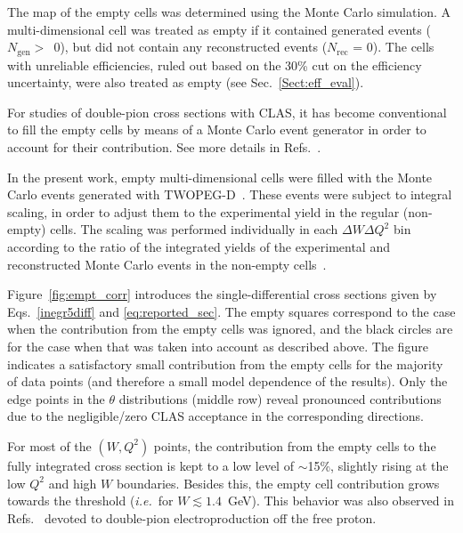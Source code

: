 \documentclass[prc,twocolumn,superscriptaddress,showpacs,amssymb,amsmath,amsfonts,aps,nofootinbib]{revtex4-1}
\begin{document}
The map of the empty cells was determined using the Monte Carlo simulation. A multi-dimensional cell was treated as empty if it contained generated events ($N_{\text{gen}} >$~0), but did not contain any reconstructed events ($N_{\text{rec}}$ = 0). The cells with unreliable efficiencies, ruled out based on the 30\% cut on the efficiency uncertainty, were also treated as empty (see Sec.\!~\ref{Sect:eff_eval}).


For studies of double-pion cross sections with CLAS, it has become conventional to fill the empty cells by means of a Monte Carlo event generator in order to account for their contribution. See more details in Refs.\!~\cite{Rip_an_note:2002,Ripani:2002ss,Fed_an_note:2007,Fedotov:2008aa,Isupov:2017lnd,Arjun,Fed_an_note:2017,Fed_paper_2018}.


In the present work, empty multi-dimensional cells were filled with the Monte Carlo events generated with TWOPEG-D~\cite{twopeg-d}. These events were subject to integral scaling, in order to adjust them to the experimental yield in the regular (non-empty) cells. The scaling was performed individually in each $\Delta W\Delta Q^2$ bin according to the ratio of the integrated yields of the experimental and reconstructed Monte Carlo events in the non-empty cells~\cite{my_an_note:2020, my_thesis:2021}. 



Figure~\ref{fig:empt_corr} introduces the single-differential cross sections given by Eqs.\!~\eqref{inegr5diff} and \eqref{eq:reported_sec}. The empty squares correspond to the case when the contribution from the empty cells was ignored, and the black circles are for the case when that was taken into account as described above. The figure indicates a satisfactory small contribution from the empty cells for the majority of data points (and therefore a small model dependence of the results). Only the edge points in the $\theta$ distributions (middle row) reveal pronounced contributions due to the negligible/zero CLAS acceptance in the corresponding directions.

For most of the $(W,Q^2)$ points, the contribution from the empty cells to the fully integrated cross section is kept to a low level of $\sim$15\%, slightly rising at the low $Q^{2}$ and high $W$ boundaries. Besides this, the empty cell contribution grows towards the threshold ({\it i.e.}~for $W\lesssim 1.4$~GeV). This behavior was also observed in Refs.\!~\cite{Fed_an_note:2017,Fed_paper_2018,Fed_an_note:2007,Fedotov:2008aa} devoted to double-pion electroproduction off the free proton.
\end{document}
